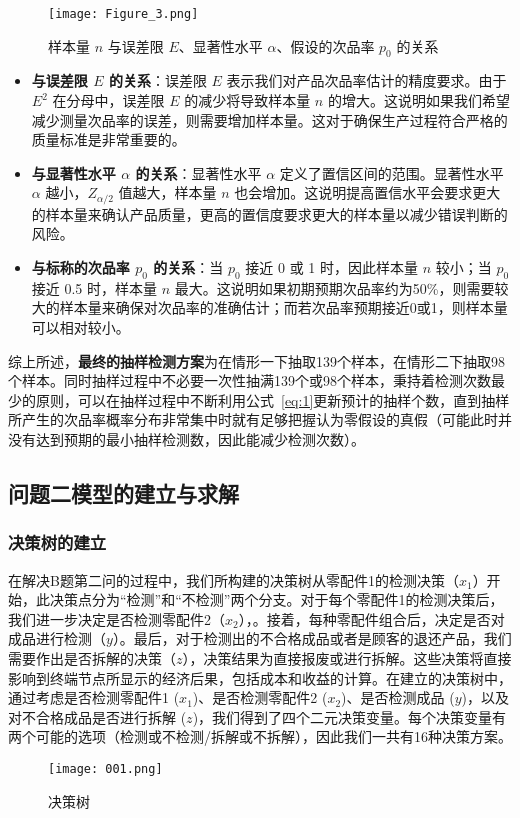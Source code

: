 \documentclass[utf8]{ctexart} %
\begin{document}
		\begin{figure}[H] %
			\centering
			\texttt{[image: Figure\_3.png]}
			\caption{样本量 \( n \) 与误差限 \( E \)、显著性水平 \( \alpha \)、假设的次品率 \( p_0 \) 的关系}
			\label{fig:sample_size_analysis}
		\end{figure}
	
		\begin{itemize} 
			\item \textbf{与误差限 \( E \) 的关系}：误差限 \( E \) 表示我们对产品次品率估计的精度要求。由于 \( E^2 \) 在分母中，误差限 \( E \) 的减少将导致样本量 \( n \) 的增大。这说明如果我们希望减少测量次品率的误差，则需要增加样本量。这对于确保生产过程符合严格的质量标准是非常重要的。
			
			\item \textbf{与显著性水平 \( \alpha \) 的关系}：显著性水平 \( \alpha \) 定义了置信区间的范围。显著性水平 \( \alpha \) 越小，\( Z_{\alpha/2} \) 值越大，样本量 \( n \) 也会增加。这说明提高置信水平会要求更大的样本量来确认产品质量，更高的置信度要求更大的样本量以减少错误判断的风险。
			\item \textbf{与标称的次品率 \( p_0 \) 的关系}：当 \( p_0 \) 接近 0 或 1 时，因此样本量 \( n \) 较小；当 \( p_0 \) 接近 0.5 时，样本量 \( n \) 最大。这说明如果初期预期次品率约为50\%，则需要较大的样本量来确保对次品率的准确估计；而若次品率预期接近0或1，则样本量可以相对较小。
		\end{itemize}
	
		综上所述，\textbf{最终的抽样检测方案}为在情形一下抽取139个样本，在情形二下抽取98个样本。同时抽样过程中不必要一次性抽满139个或98个样本，秉持着检测次数最少的原则，可以在抽样过程中不断利用公式~\eqref{eq:1}更新预计的抽样个数，直到抽样所产生的次品率概率分布非常集中时就有足够把握认为零假设的真假（可能此时并没有达到预期的最小抽样检测数，因此能减少检测次数）。
		
		\subsection{问题二模型的建立与求解}
		\subsubsection{决策树的建立}
		在解决B题第二问的过程中，我们所构建的决策树从零配件1的检测决策（$x_1$）开始，此决策点分为“检测”和“不检测”两个分支。对于每个零配件1的检测决策后，我们进一步决定是否检测零配件2（$x_2$），。接着，每种零配件组合后，决定是否对成品进行检测（$y$）。最后，对于检测出的不合格成品或者是顾客的退还产品，我们需要作出是否拆解的决策（$z$），决策结果为直接报废或进行拆解。这些决策将直接影响到终端节点所显示的经济后果，包括成本和收益的计算。在建立的决策树中，通过考虑是否检测零配件1 ($x_1$)、是否检测零配件2 ($x_2$)、是否检测成品 ($y$)，以及对不合格成品是否进行拆解 ($z$)，我们得到了四个二元决策变量。每个决策变量有两个可能的选项（检测或不检测/拆解或不拆解），因此我们一共有16种决策方案。
			\begin{figure}[H] %
				\centering
				\texttt{[image: 001.png]}
				\caption{决策树}
				\label{fig:label}
			\end{figure}
		
\end{document}
